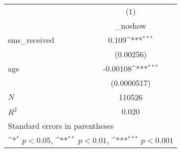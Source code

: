 {
\def\sym#1{\ifmmode^{#1}\else\(^{#1}\)\fi}
\begin{tabular}{l*{1}{c}}
\toprule
            &\multicolumn{1}{c}{(1)}\\
            &\multicolumn{1}{c}{\_noshow}\\
\midrule
sms\_received&       0.109\sym{***}\\
            &   (0.00256)         \\
\addlinespace
age         &    -0.00108\sym{***}\\
            & (0.0000517)         \\
\midrule
\(N\)       &      110526         \\
\(R^{2}\)   &       0.020         \\
\bottomrule
\multicolumn{2}{l}{\footnotesize Standard errors in parentheses}\\
\multicolumn{2}{l}{\footnotesize \sym{*} \(p<0.05\), \sym{**} \(p<0.01\), \sym{***} \(p<0.001\)}\\
\end{tabular}
}

